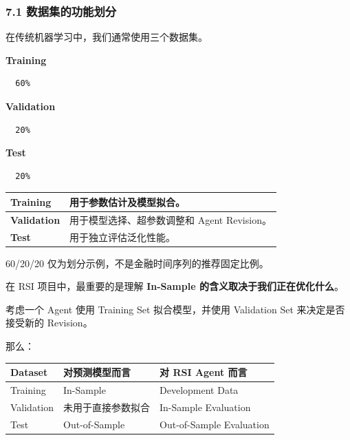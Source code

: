 \hypertarget{part-2-12-0001-ux6570ux636eux96c6ux7684ux529fux80fdux5212ux5206}{%
\subsubsection{7.1 数据集的功能划分}\label{part-2-12-0001-ux6570ux636eux96c6ux7684ux529fux80fdux5212ux5206}}

在传统机器学习中，我们通常使用三个数据集。

\textbf{Training}

\begin{verbatim}
  60%
\end{verbatim}

\textbf{Validation}

\begin{verbatim}
  20%
\end{verbatim}

\textbf{Test}

\begin{verbatim}
  20%
\end{verbatim}

\begin{readertable}
\begin{longtable}[]{@{}
  >{\raggedright\arraybackslash}p{}
  >{\raggedright\arraybackslash}p{}@{}}
\toprule
\textbf{Training} & 用于参数估计及模型拟合。 \\
\midrule
\endhead
\textbf{Validation} & 用于模型选择、超参数调整和 Agent Revision。 \\
\textbf{Test} & 用于独立评估泛化性能。 \\
\bottomrule
\end{longtable}
\end{readertable}

60/20/20 仅为划分示例，不是金融时间序列的推荐固定比例。

在 RSI 项目中，最重要的是理解 \textbf{In-Sample 的含义取决于我们正在优化什么}。

考虑一个 Agent 使用 Training Set 拟合模型，并使用 Validation Set 来决定是否接受新的 Revision。

那么：

\begin{readertable}
\begin{longtable}[]{@{}
  >{\raggedright\arraybackslash}p{}
  >{\raggedright\arraybackslash}p{}
  >{\raggedright\arraybackslash}p{}@{}}
\toprule
Dataset & 对预测模型而言 & 对 RSI Agent 而言 \\
\midrule
\endhead
Training & In-Sample & Development Data \\
Validation & 未用于直接参数拟合 & In-Sample Evaluation \\
Test & Out-of-Sample & Out-of-Sample Evaluation \\
\bottomrule
\end{longtable}
\end{readertable}

